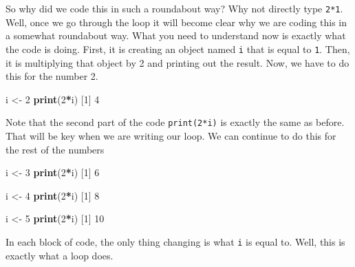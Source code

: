 \documentclass[
]{book}
\newenvironment{Shaded}{\begin{snugshade}}{\end{snugshade}}
\newcommand{\DecValTok}[1]{\textcolor[rgb]{0.00,0.00,0.81}{#1}}
\newcommand{\FunctionTok}[1]{\textcolor[rgb]{0.13,0.29,0.53}{\textbf{#1}}}
\newcommand{\NormalTok}[1]{#1}
\newcommand{\OtherTok}[1]{\textcolor[rgb]{0.56,0.35,0.01}{#1}}
\newcommand{\SpecialCharTok}[1]{\textcolor[rgb]{0.81,0.36,0.00}{\textbf{#1}}}
\begin{document}
So why did we code this in such a roundabout way? Why not directly type \texttt{2*1}. Well, once we go through the loop it will become clear why we are coding this in a somewhat roundabout way. What you need to understand now is exactly what the code is doing. First, it is creating an object named \texttt{i} that is equal to \texttt{1}. Then, it is multiplying that object by 2 and printing out the result. Now, we have to do this for the number 2.

\begin{Shaded}
\begin{Highlighting}[]
\NormalTok{i }\OtherTok{\textless{}{-}} \DecValTok{2} 
\FunctionTok{print}\NormalTok{(}\DecValTok{2}\SpecialCharTok{*}\NormalTok{i)}
\NormalTok{[}\DecValTok{1}\NormalTok{] }\DecValTok{4}
\end{Highlighting}
\end{Shaded}

Note that the second part of the code \texttt{print(2*i)} is exactly the same as before. That will be key when we are writing our loop. We can continue to do this for the rest of the numbers

\begin{Shaded}
\begin{Highlighting}[]
\NormalTok{i }\OtherTok{\textless{}{-}} \DecValTok{3} 
\FunctionTok{print}\NormalTok{(}\DecValTok{2}\SpecialCharTok{*}\NormalTok{i)}
\NormalTok{[}\DecValTok{1}\NormalTok{] }\DecValTok{6}
\end{Highlighting}
\end{Shaded}

\begin{Shaded}
\begin{Highlighting}[]
\NormalTok{i }\OtherTok{\textless{}{-}} \DecValTok{4} 
\FunctionTok{print}\NormalTok{(}\DecValTok{2}\SpecialCharTok{*}\NormalTok{i)}
\NormalTok{[}\DecValTok{1}\NormalTok{] }\DecValTok{8}
\end{Highlighting}
\end{Shaded}

\begin{Shaded}
\begin{Highlighting}[]
\NormalTok{i }\OtherTok{\textless{}{-}} \DecValTok{5} 
\FunctionTok{print}\NormalTok{(}\DecValTok{2}\SpecialCharTok{*}\NormalTok{i)}
\NormalTok{[}\DecValTok{1}\NormalTok{] }\DecValTok{10}
\end{Highlighting}
\end{Shaded}

In each block of code, the only thing changing is what \texttt{i} is equal to. Well, this is exactly what a loop does.
\end{document}
